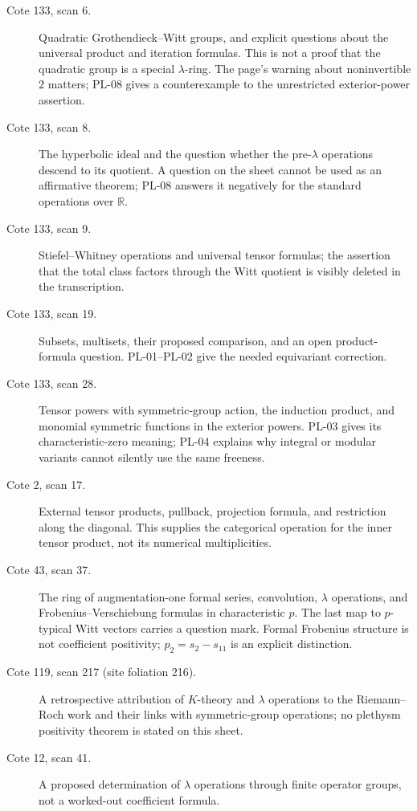 \begin{description}
\item[Cote 133, scan 6.] Quadratic Grothendieck--Witt groups, and explicit
questions about the universal product and iteration formulas. This is not
a proof that the quadratic group is a special $\lambda$-ring. The page's
warning about noninvertible $2$ matters; PL-08 gives a counterexample to
the unrestricted exterior-power assertion.
\item[Cote 133, scan 8.] The hyperbolic ideal and the question whether the
pre-$\lambda$ operations descend to its quotient. A question on the sheet
cannot be used as an affirmative theorem; PL-08 answers it negatively
for the standard operations over $\mathbb R$.
\item[Cote 133, scan 9.] Stiefel--Whitney operations and universal tensor
formulas; the assertion that the total class factors through the Witt
quotient is visibly deleted in the transcription.
\item[Cote 133, scan 19.] Subsets, multisets, their proposed comparison, and
an open product-formula question. PL-01--PL-02 give the needed equivariant
correction.
\item[Cote 133, scan 28.] Tensor powers with symmetric-group action, the
induction product, and monomial symmetric functions in the exterior powers.
PL-03 gives its characteristic-zero meaning; PL-04 explains why integral
or modular variants cannot silently use the same freeness.
\item[Cote 2, scan 17.] External tensor products, pullback, projection
formula, and restriction along the diagonal. This supplies the categorical
operation for the inner tensor product, not its numerical multiplicities.
\item[Cote 43, scan 37.] The ring of augmentation-one formal series,
convolution, $\lambda$ operations, and Frobenius--Verschiebung formulas in
characteristic $p$. The last map to $p$-typical Witt vectors carries a
question mark. Formal Frobenius structure is not coefficient positivity;
$p_2=s_2-s_{11}$ is an explicit distinction.
\item[Cote 119, scan 217 (site foliation 216).] A retrospective attribution
of $K$-theory and $\lambda$ operations to the Riemann--Roch work and their
links with symmetric-group operations; no plethysm positivity theorem is
stated on this sheet.
\item[Cote 12, scan 41.] A proposed determination of $\lambda$ operations
through finite operator groups, not a worked-out coefficient formula.

\end{description}

